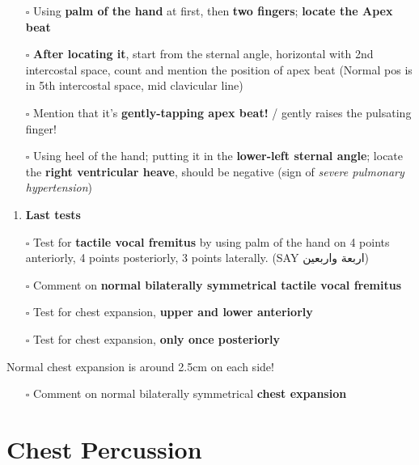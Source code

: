 \documentclass[
  13.5pt,
  a4paper,
  DIV=11,
  numbers=noendperiod]{scrreprt}
\providecommand{\tightlist}{%
  \setlength{\itemsep}{0pt}\setlength{\parskip}{0pt}}
\begin{document}
\begin{itemize}
\tightlist
\item[$\square$]
  Using \textbf{palm of the hand} at first, then \textbf{two fingers};
  \textbf{locate the Apex beat}
\item[$\square$]
  \textbf{After locating it}, start from the sternal angle, horizontal
  with 2nd intercostal space, count and mention the position of apex
  beat (Normal pos is in 5th intercostal space, mid clavicular line)
\item[$\square$]
  Mention that it's \textbf{gently-tapping apex beat!} / gently raises
  the pulsating finger!
\item[$\square$]
  Using heel of the hand; putting it in the \textbf{lower-left sternal
  angle}; locate the \textbf{right ventricular heave}, should be
  negative (sign of \emph{severe pulmonary hypertension})
\end{itemize}

\begin{enumerate}
\def\labelenumi{\arabic{enumi})}
\setcounter{enumi}{3}
\tightlist
\item
  \textbf{Last tests}
\end{enumerate}

\begin{itemize}
\tightlist
\item[$\square$]
  Test for \textbf{tactile vocal fremitus} by using palm of the hand on
  4 points anteriorly, 4 points posteriorly, 3 points laterally. (SAY
  اربعة واربعين)
\item[$\square$]
  Comment on \textbf{normal bilaterally symmetrical tactile vocal
  fremitus}
\item[$\square$]
  Test for chest expansion, \textbf{upper and lower anteriorly}
\item[$\square$]
  Test for chest expansion, \textbf{only once posteriorly}
\end{itemize}

Normal chest expansion is around 2.5cm on each side!

\begin{itemize}
\tightlist
\item[$\square$]
  Comment on normal bilaterally symmetrical \textbf{chest expansion}
\end{itemize}

\section{Chest Percussion}\label{chest-percussion}
\end{document}
